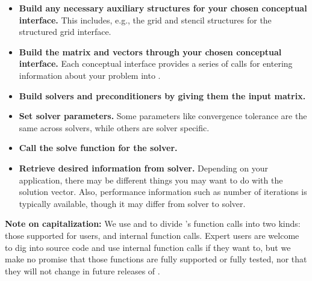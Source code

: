 \begin{itemize}

\item
{\bf Build any necessary auxiliary structures for your chosen conceptual
interface.} This includes, e.g., 
the grid and stencil structures for the structured grid interface.

\item
{\bf Build the matrix and vectors through your chosen conceptual interface.} Each
conceptual interface 
provides a series of calls for entering information about your problem into
\hypre{}.

\item
{\bf Build solvers and preconditioners by giving them the input matrix.}

\item
{\bf Set solver parameters.} Some parameters like convergence tolerance are the
same across solvers, 
while others are solver specific.

\item
{\bf Call the solve function for the solver.}

\item
{\bf Retrieve desired information from solver.} Depending on your application,
there may be different 
things you may want to do with the solution vector. Also, performance
information such as number of 
iterations is typically available, though it may differ from solver to solver.

\end{itemize}


{\bf Note on capitalization:} We use  and 
to divide \hypre{}'s function
calls into two kinds: 
those supported for users, and internal function calls. Expert users are
welcome to dig into \hypre{} source 
code and use internal function calls if they want to, but we make no promise
that those functions are fully 
supported or fully tested, nor that they will not change in future releases of
\hypre{}. 


